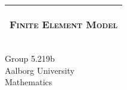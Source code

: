 %
%
%
%
%
\begin{titlepage}
  \addtolength{\hoffset}{0.5\evensidemargin-0.5\oddsidemargin} %
  \noindent%
  \begin{tabular}{@{}p{\textwidth}@{}}
    \toprule[2pt]
    \midrule
    \vspace{0.4cm}
    \begin{center}
    \Huge{\textsc{Finite Element Model}}
    \end{center}
    \vspace{0.4cm}
   \begin{center}
    \Large{\textsc{}}%
    \end{center}
    \vspace{0.4cm}\\
    \midrule
    \toprule[2pt]
  \end{tabular}
  \vspace{0.8cm}
  \setlength\fboxsep{0pt}
    \setlength\fboxsep{5pt}
  \vfill
\begin{center}
  {\large{Group 5.219b} \\
    {Aalborg University} \\
    {Mathematics} \\}
\end{center}
  
\end{titlepage}
